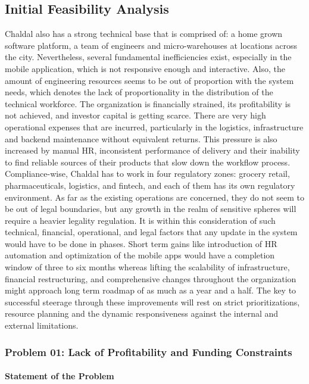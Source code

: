 \documentclass[12pt,a4paper]{article}
\begin{document}
\subsection{Initial Feasibility Analysis}
Chaldal also has a strong technical base that is comprised of: a home grown software platform, a team of engineers and micro-warehouses at locations across the city. Nevertheless, several fundamental inefficiencies exist, especially in the mobile application, which is not responsive enough and interactive. Also, the amount of engineering resources seems to be out of proportion with the system needs, which denotes the lack of proportionality in the distribution of the technical workforce. The organization is financially strained, its profitability is not achieved, and investor capital is getting scarce. There are very high operational expenses that are incurred, particularly in the logistics, infrastructure and backend maintenance without equivalent returns. This pressure is also increased by manual HR, inconsistent performance of delivery and their inability to find reliable sources of their products that slow down the workflow process. Compliance-wise, Chaldal has to work in four regulatory zones: grocery retail, pharmaceuticals, logistics, and fintech, and each of them has its own regulatory environment. As far as the existing operations are concerned, they do not seem to be out of legal boundaries, but any growth in the realm of sensitive spheres will require a heavier legality regulation. It is within this consideration of such technical, financial, operational, and legal factors that any update in the system would have to be done in phases. Short term gains like introduction of HR automation and optimization of the mobile apps would have a completion window of three to six months whereas lifting the scalability of infrastructure, financial restructuring, and comprehensive changes throughout the organization might approach long term roadmap of as much as a year and a half. The key to successful steerage through these improvements will rest on strict prioritizations, resource planning and the dynamic responsiveness against the internal and external limitations.
\subsubsection{Problem 01: Lack of Profitability and Funding Constraints}

\paragraph{Statement of the Problem}
\end{document}
